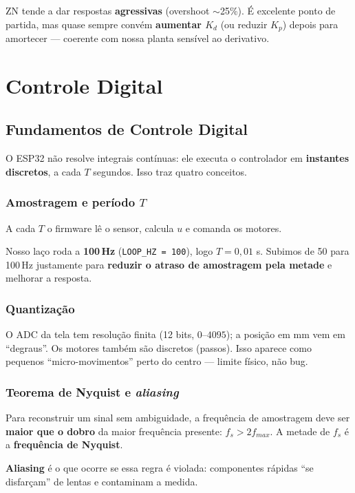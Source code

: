 \begin{atencao}
ZN tende a dar respostas \textbf{agressivas} (overshoot $\sim$25\%). \'E excelente
ponto de partida, mas quase sempre conv\'em \textbf{aumentar $K_d$} (ou reduzir
$K_p$) depois para amortecer --- coerente com nossa planta sens\'ivel ao
derivativo.
\end{atencao}

\part{Controle Digital}

\chapter{Fundamentos de Controle Digital}\label{cap:digital}

O ESP32 n\~ao resolve integrais cont\'inuas: ele executa o controlador em
\textbf{instantes discretos}, a cada $T$ segundos. Isso traz quatro conceitos.

\section{Amostragem e per\'iodo $T$}
A cada $T$ o firmware l\^e o sensor, calcula $u$ e comanda os motores.
\begin{projeto}
Nosso la\c{c}o roda a \textbf{100\,Hz} (\texttt{LOOP\_HZ = 100}), logo
$T=0{,}01$ s. Subimos de 50 para 100\,Hz justamente para \textbf{reduzir o atraso
de amostragem pela metade} e melhorar a resposta.
\end{projeto}

\section{Quantiza\c{c}\~ao}
O ADC da tela tem resolu\c{c}\~ao finita (12 bits, $0$--$4095$); a posi\c{c}\~ao em
mm vem em ``degraus''. Os motores tamb\'em s\~ao discretos (passos). Isso aparece
como pequenos ``micro-movimentos'' perto do centro --- limite f\'isico, n\~ao bug.

\section{Teorema de Nyquist e \emph{aliasing}}
\begin{conceito}[Nyquist]
Para reconstruir um sinal sem ambiguidade, a frequ\^encia de amostragem deve ser
\textbf{maior que o dobro} da maior frequ\^encia presente: $f_s > 2 f_{max}$. A
metade de $f_s$ \'e a \textbf{frequ\^encia de Nyquist}.
\end{conceito}
\textbf{Aliasing} \'e o que ocorre se essa regra \'e violada: componentes r\'apidas
``se disfar\c{c}am'' de lentas e contaminam a medida.

